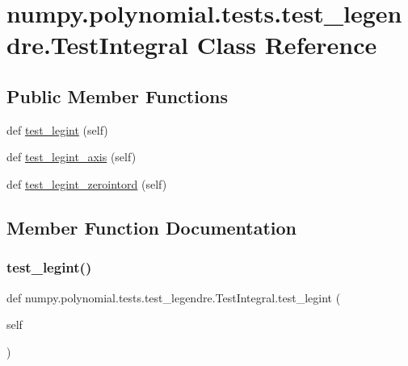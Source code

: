 \hypertarget{classnumpy_1_1polynomial_1_1tests_1_1test__legendre_1_1TestIntegral}{}\section{numpy.\+polynomial.\+tests.\+test\+\_\+legendre.\+Test\+Integral Class Reference}
\label{classnumpy_1_1polynomial_1_1tests_1_1test__legendre_1_1TestIntegral}
\subsection*{Public Member Functions}
\begin{DoxyCompactItemize}
\item 
def \hyperlink{classnumpy_1_1polynomial_1_1tests_1_1test__legendre_1_1TestIntegral_a34647de479ed287ed819c780ee6345fa}{test\+\_\+legint} (self)
\item 
def \hyperlink{classnumpy_1_1polynomial_1_1tests_1_1test__legendre_1_1TestIntegral_ac82a230d5148ab38e16ad7313d43a8d5}{test\+\_\+legint\+\_\+axis} (self)
\item 
def \hyperlink{classnumpy_1_1polynomial_1_1tests_1_1test__legendre_1_1TestIntegral_add8d58550ebff99bbd163f1a7685d7be}{test\+\_\+legint\+\_\+zerointord} (self)
\end{DoxyCompactItemize}


\subsection{Member Function Documentation}
\mbox{\label{classnumpy_1_1polynomial_1_1tests_1_1test__legendre_1_1TestIntegral_a34647de479ed287ed819c780ee6345fa}} 
\subsubsection{\texorpdfstring{test\+\_\+legint()}{test\_legint()}}
{\footnotesize\ttfamily def numpy.\+polynomial.\+tests.\+test\+\_\+legendre.\+Test\+Integral.\+test\+\_\+legint (\begin{DoxyParamCaption}\item[{}]{self }\end{DoxyParamCaption})}

